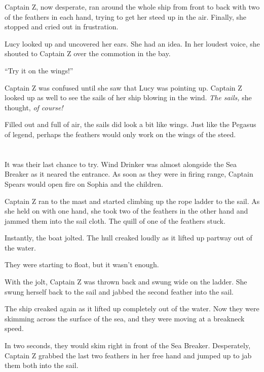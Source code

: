 \documentclass[12pt]{extbook}
\begin{document}
  Captain Z, now desperate, ran around the whole ship from front to back
  with two of the feathers in each hand, trying to get her steed up in the
  air. Finally, she stopped and cried out in frustration.
  
  Lucy looked up and uncovered her ears. She had an idea. In her loudest
  voice, she shouted to Captain Z over the commotion in the bay.
  
  \enquote{Try it on the wings!}
  
  Captain Z was confused until she saw that Lucy was pointing up. Captain
  Z looked up as well to see the sails of her ship blowing in the wind.
  \emph{The sails,} she thought, \emph{of course!}
  
  Filled out and full of air, the sails did look a bit like wings. Just
  like the Pegasus of legend, perhaps the feathers would only work on the
  wings of the steed.
  
  \section{}\label{section-42}
  
  It was their last chance to try. Wind Drinker was almost alongside the
  Sea Breaker as it neared the entrance. As soon as they were in firing
  range, Captain Spears would open fire on Sophia and the children.
  
  Captain Z ran to the mast and started climbing up the rope ladder to the
  sail. As she held on with one hand, she took two of the feathers in the
  other hand and jammed them into the sail cloth. The quill of one of the
  feathers stuck.
  
  Instantly, the boat jolted. The hull creaked loudly as it lifted up
  partway out of the water.
  
  They were starting to float, but it wasn't enough.
  
  With the jolt, Captain Z was thrown back and swung wide on the ladder.
  She swung herself back to the sail and jabbed the second feather into
  the sail.
  
  The ship creaked again as it lifted up completely out of the water. Now
  they were skimming across the surface of the sea, and they were moving
  at a breakneck speed.
  
  In two seconds, they would skim right in front of the Sea Breaker.
  Desperately, Captain Z grabbed the last two feathers in her free hand
  and jumped up to jab them both into the sail.
  
\end{document}
